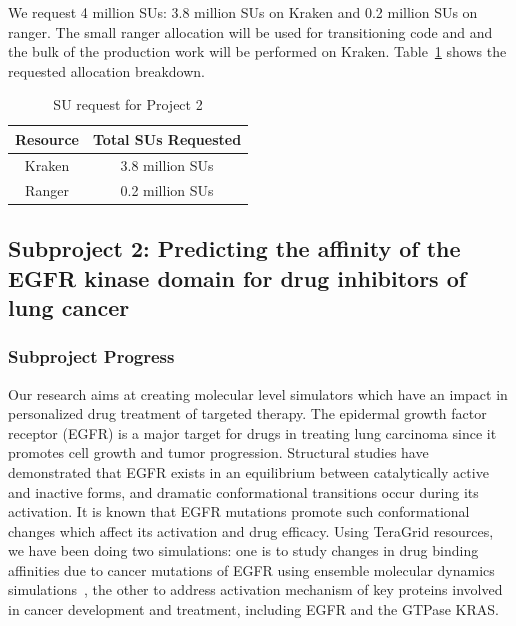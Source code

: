 \documentclass[a4paper,10pt]{article}
\newcommand{\up}{\vspace*{-1em}}
\begin{document}
We request 4 million SUs: 3.8 million SUs on Kraken and 0.2 million SUs on ranger. The small ranger allocation will be used for transitioning code and and the bulk of the production work will be performed on Kraken. Table~\ref{table:project21} shows the requested allocation breakdown.


\begin{table}[!h]
\begin{center}
\begin{tabular}{|c|c| }
\hline 
Resource & Total SUs Requested \\ 
\hline
Kraken   & 3.8 million SUs \\
\hline
Ranger   & 0.2 million SUs \\
\hline
\end{tabular}
\end{center}
  \caption{SU request for Project 2}\label{table:project21}
\up
\end{table}


\subsection{Subproject 2: Predicting the affinity of the EGFR kinase domain for drug inhibitors of lung cancer}

\subsubsection{Subproject Progress}
Our research aims at creating molecular level simulators which have an impact in personalized drug treatment of targeted therapy. The epidermal growth factor receptor (EGFR) is a major target for drugs in treating lung carcinoma since it promotes cell growth and tumor progression. Structural studies have demonstrated that EGFR exists in an equilibrium between catalytically active and inactive forms, and dramatic conformational transitions occur during its activation. It is known that EGFR mutations promote such conformational changes which affect its activation and drug efficacy. Using TeraGrid resources, we have been doing two simulations: one is to study changes in drug binding affinities due to cancer mutations of EGFR using ensemble molecular dynamics simulations~\cite{Ref6,Ref7,Ref8}, the other to address activation mechanism of key proteins involved in cancer development and treatment, including EGFR and the GTPase KRAS.
\end{document}
